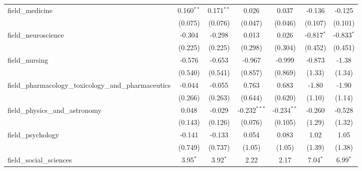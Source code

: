 \begin{tabular}{lcccccc}
   field\_medicine                                             & 0.160$^{**}$   & 0.171$^{**}$   & 0.026          & 0.037           & -0.136       & -0.125\\   
                                                               & (0.075)        & (0.076)        & (0.047)        & (0.046)         & (0.107)      & (0.101)\\   
   field\_neuroscience                                         & -0.304         & -0.298         & 0.013          & 0.026           & -0.817$^{*}$ & -0.833$^{*}$\\   
                                                               & (0.225)        & (0.225)        & (0.298)        & (0.304)         & (0.452)      & (0.451)\\   
   field\_nursing                                              & -0.576         & -0.653         & -0.967         & -0.999          & -0.873       & -1.38\\   
                                                               & (0.540)        & (0.541)        & (0.857)        & (0.869)         & (1.33)       & (1.34)\\   
   field\_pharmacology\_toxicology\_and\_pharmaceutics         & -0.044         & -0.055         & 0.763          & 0.683           & -1.80        & -1.90\\   
                                                               & (0.266)        & (0.263)        & (0.644)        & (0.620)         & (1.10)       & (1.14)\\   
   field\_physics\_and\_astronomy                              & 0.048          & -0.029         & -0.232$^{***}$ & -0.234$^{**}$   & -0.260       & -0.528\\   
                                                               & (0.143)        & (0.126)        & (0.076)        & (0.105)         & (1.29)       & (1.32)\\   
   field\_psychology                                           & -0.141         & -0.133         & 0.054          & 0.083           & 1.02         & 1.05\\   
                                                               & (0.749)        & (0.737)        & (1.05)         & (1.05)          & (1.39)       & (1.38)\\   
   field\_social\_sciences                                     & 3.95$^{*}$     & 3.92$^{*}$     & 2.22           & 2.17            & 7.04$^{*}$   & 6.99$^{*}$\\   

\end{tabular}
